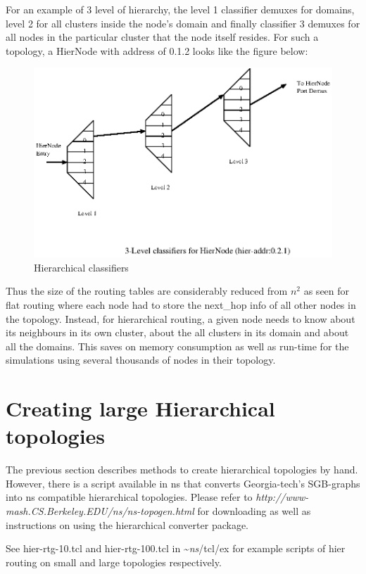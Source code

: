 For an example of 3 level of hierarchy, the level 1 classifier demuxes
for domains, level 2 for all clusters inside the node's domain and
finally classifier 3 demuxes for all nodes in the particular cluster
that the node itself resides. For such a topology, a HierNode with
address of 0.1.2 looks like the figure below:
\begin{figure}[tb]
\centerline{\includegraphics{hier-classifier}}
\caption{Hierarchical classifiers}
\label{fig:hier-classifier}
\end{figure}

Thus the size of the routing tables are considerably reduced from 
$n^{2}$ as seen for flat routing where each node had to store the
  next\_hop info of all other nodes in the topology. Instead, for
  hierarchical routing, a given node needs to know about its neighbours
  in its own cluster, about the all clusters in its domain and about all
  the domains. This saves on memory consumption as well as run-time for
  the simulations using several thousands of nodes in their topology.


\section{Creating large Hierarchical topologies}
\label{large-hier-topo}
The previous section describes methods to create hierarchical topologies
by hand. However, there is a script available in ns that converts
Georgia-tech's SGB-graphs into ns compatible hierarchical topologies.
Please refer to {\em http://www-mash.CS.Berkeley.EDU/ns/ns-topogen.html}
for downloading as well as instructions on using the hierarchical
converter package. 

See hier-rtg-10.tcl and hier-rtg-100.tcl in \textasciitilde\emph{ns}/{tcl/ex} for example
scripts of hier routing on small and large topologies
respectively. 



